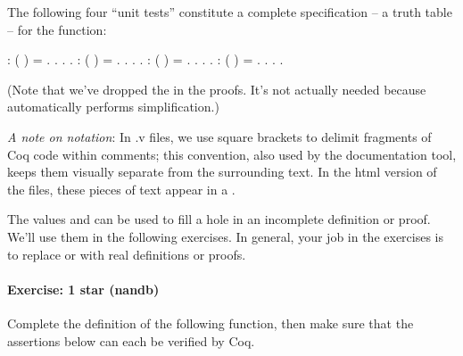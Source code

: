 \documentclass[12pt]{report}
\begin{document}
 The following four ``unit tests'' constitute a complete
    specification -- a truth table -- for the  function: \begin{coqdoccode}
\coqdocemptyline
\coqdocnoindent
{} :  (   ) = .\coqdoceol
\coqdocnoindent
{}. . .\coqdoceol
\coqdocnoindent
{} :  (  ) = .\coqdoceol
\coqdocnoindent
{}. . .\coqdoceol
\coqdocnoindent
{} :  (  )  = .\coqdoceol
\coqdocnoindent
{}. . .\coqdoceol
\coqdocnoindent
{} :  (   )  = .\coqdoceol
\coqdocnoindent
{}. . .\coqdoceol
\coqdocemptyline
\end{coqdoccode}
(Note that we've dropped the  in the proofs.  It's not
    actually needed because  automatically performs
    simplification.) 

 \textit{A note on notation}: In .v files, we use square brackets to
    delimit fragments of Coq code within comments; this convention,
    also used by the  documentation tool, keeps them visually
    separate from the surrounding text.  In the html version of the
    files, these pieces of text appear in a  . 

 The values  and  can be used to fill
    a hole in an incomplete definition or proof.  We'll use them in the
    following exercises.  In general, your job in the exercises is 
    to replace  or  with real definitions or proofs. 

\paragraph{Exercise: 1 star (nandb)}

 Complete the definition of the following function, then make
    sure that the  assertions below can each be verified by
    Coq.  
\end{document}
